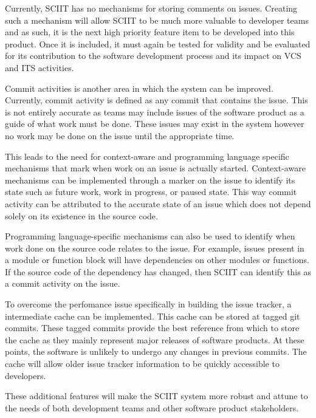 \documentclass{mproj}
\begin{document}
Currently, SCIIT has no mechanisms for storing comments on issues. Creating such a mechanism will allow SCIIT to be much more valuable to developer teams and as such, it is the next high priority feature item to be developed into this product. Once it is included, it must again be tested for validity and be evaluated for its contribution to the software development process and its impact on VCS and ITS activities.

Commit activities is another area in which the system can be improved. Currently, commit activity is defined as any commit that contains the issue. This is not entirely accurate as teams may include issues of the software product as a guide of what work must be done. These issues may exist in the system however no work may be done on the issue until the appropriate time.

This leads to the need for context-aware and programming language specific mechanisms that mark when work on an issue is actually started. Context-aware mechanisms can be implemented through a marker on the issue to identify its state such as future work, work in progress, or paused state. This way commit activity can be attributed to the accurate state of an issue which does not depend solely on its existence in the source code.

Programming language-specific mechanisms can also be used to identify when work done on the source code relates to the issue. For example, issues present in a module or function block will have dependencies on other modules or functions. If the source code of the dependency has changed, then SCIIT can identify this as a commit activity on the issue.

To overcome the perfomance issue specifically in building the issue tracker, a intermediate cache can be implemented. This cache can be stored at tagged git commits. These tagged commits provide the best reference from which to store the cache as they mainly represent major releases of software products. At these points, the software is unlikely to undergo any changes in previous commits. The cache will allow older issue tracker information to be quickly accessible to developers.

These additional features will make the SCIIT system more robust and attune to the needs of both development teams and other software product stakeholders.


\appendix %
\end{document}
